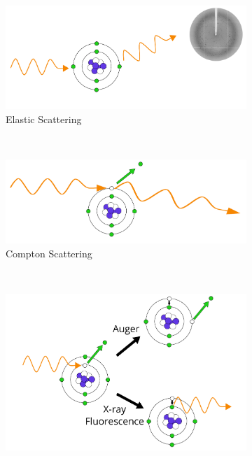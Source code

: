         \begin{figure}
            \centering
            \begin{subfigure}[b]{0.9\textwidth}
                    \centering
                    \includegraphics[width=\textwidth]{figures/introduction/elasticscatter.pdf}
                    \caption{Elastic Scattering}
                    \label{fig:Elastic scatter diagram}
            \end{subfigure}
            \\
            \begin{subfigure}[b]{0.9\textwidth}
                    \centering
                    \includegraphics[width=\textwidth]{figures/introduction/comptonscatter.pdf}
                    \caption{Compton Scattering}
                    \label{fig:Compton scatter diagram}
            \end{subfigure}
            \\
            \begin{subfigure}[b]{0.9\textwidth}
                    \centering
                    \includegraphics[width=\textwidth]{figures/introduction/photoelectriceffect.pdf}

\end{subfigure}
\end{figure}
